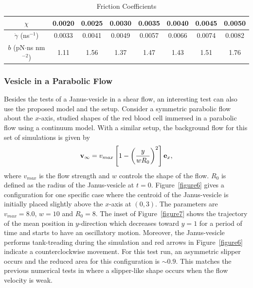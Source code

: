 \documentclass[lineno]{jfm}
\begin{document}
\begin{table}
\caption{Friction Coefficients}
\centering    
\begin{tabular}{c c c c c c c c }
 $\chi$ & 0.0020   &  0.0025 &  0.0030 &  0.0035 &  0.0040 & 0.0045 & 0.0050  \\
\hline                    
$\dot\gamma$ (ns$^{-1}$)        & 0.0033 & 0.0041 & 0.0049 & 0.0057 & 0.0066 & 0.0074 & 0.0082\\
$b$ (pN$\cdot$ns nm$^{-2}$)   & 1.11 & 1.56 & 1.37 & 1.47 & 1.43 & 1.51 & 1.76\\ 
\hline    
\end{tabular} 
\label{table1}
\end{table}


\subsubsection{Vesicle in a Parabolic Flow}

Besides the tests of a Janus-vesicle in a shear flow, an interesting test can also use the proposed model and the setup. Consider a symmetric parabolic flow about the $x$-axis, \cite{Kaoui09} studied shapes of the red blood cell immersed in a parabolic flow using a continuum model. With a similar setup, the background flow for this set of simulations is given by
\begin{equation}
{\bf v}_\infty = v_{max}\left[ 1 - \left( \frac{y}{wR_0}\right)^2 \right]{\bf e}_x,
\end{equation}
%
where $v_{max}$ is the flow strength and $w$ controls the shape of the flow. $R_0$ is defined as the radius of the Janus-vesicle at $t=0$. Figure~\ref{figure6} gives a configuration for one specific case where the centroid of the Janus-vesicle is initially placed slightly above the $x$-axis at $(0,3)$. The parameters are $v_{max} = 8.0$, $w=10$ and $R_0=8$. The inset of Figure~\ref{figure7} shows the trajectory of the mean position in $y$-direction which decreases toward $y=1$ for a period of time and starts to have an oscillatory motion. Moreover, the Janus-vesicle performs tank-treading during the simulation and red arrows in Figure~\ref{figure6} indicate a counterclockwise movement. For this test run, an asymmetric slipper occurs and the reduced area for this configuration is $\sim0.9$. This matches the previous numerical tests in  \cite{Kaoui09} where a slipper-like shape occurs when the flow velocity is weak.
\end{document}
